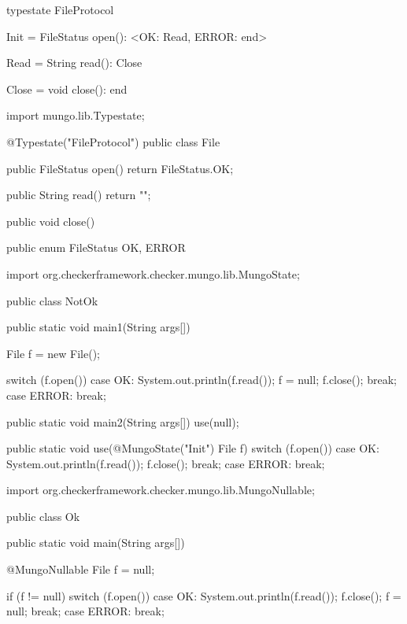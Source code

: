 \begin{code}
typestate FileProtocol {

  Init = {
    FileStatus open(): <OK: Read, ERROR: end>
  }

  Read = {
    String read(): Close
  }

  Close = {
    void close(): end
  }

}\end{code}

\begin{code}
import mungo.lib.Typestate;

@Typestate("FileProtocol")
public class File {

  public FileStatus open() {
    return FileStatus.OK;
  }

  public String read() {
    return "";
  }

  public void close() {

  }

}\end{code}

\begin{code}
public enum FileStatus {
  OK, ERROR
}\end{code}

\begin{code}
import org.checkerframework.checker.mungo.lib.MungoState;

public class NotOk {
  public static void main1(String args[]) {
    File f = new File();

    switch (f.open()) {
      case OK:
        System.out.println(f.read());
        f = null;
        f.close();
        break;
      case ERROR:
        break;
    }
  }

  public static void main2(String args[]) {
    use(null);
  }

  public static void use(@MungoState("Init") File f) {
    switch (f.open()) {
      case OK:
        System.out.println(f.read());
        f.close();
        break;
      case ERROR:
        break;
    }
  }
}\end{code}

\begin{code}
import org.checkerframework.checker.mungo.lib.MungoNullable;

public class Ok {
  public static void main(String args[]) {
    @MungoNullable File f = null;

    if (f != null) {
      switch (f.open()) {
        case OK:
          System.out.println(f.read());
          f.close();
          f = null;
          break;
        case ERROR:
          break;
      }
    }
  }
}\end{code}

